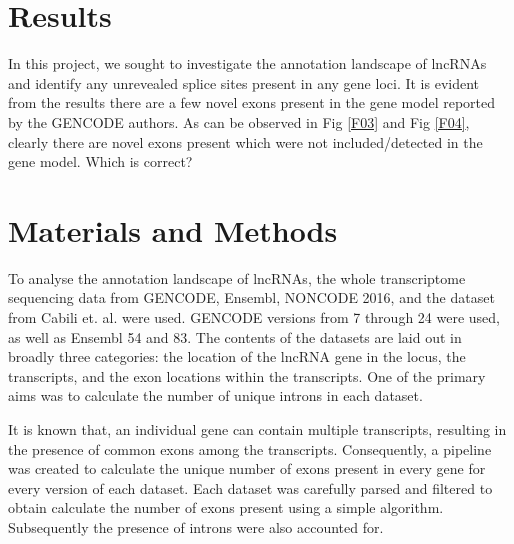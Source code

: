 \documentclass[ncrna,article,submit,moreauthors,pdftex,10pt,a4paper]{mdpi}
\newcommand{\TODO}[1]{\begingroup\color{red}#1\endgroup}
\begin{document}
\section{Results}

In this project, we sought to investigate the annotation landscape of lncRNAs and identify any unrevealed splice sites present
in any gene loci.
It is evident from the results there are a few novel exons present in the gene model reported by the GENCODE authors. As can be observed in
Fig \ref{F03} and Fig \ref{F04}, clearly there are novel exons present which were not included/detected in the gene model. \TODO{Which is correct?}





\section{Materials and Methods}

To analyse the annotation landscape of lncRNAs, the whole transcriptome sequencing data from GENCODE, Ensembl, NONCODE 2016, 
and the dataset from Cabili et. al. were used. GENCODE versions from 7 through 24 were used, as well as Ensembl 54 and 83.
The contents of the datasets are laid out in broadly three categories: the location of the lncRNA gene in the locus, 
the transcripts, and the exon locations within the transcripts. One of the primary aims was to calculate
the number of unique introns in each dataset. 

It is known that, an individual gene can contain multiple transcripts, resulting in the presence of common exons among the transcripts.
 Consequently, a pipeline was created to calculate the unique number of exons present in every gene for every version of each dataset. 
 Each dataset was carefully parsed and filtered to obtain calculate the number of exons present using a simple algorithm. Subsequently
 the presence of introns were also accounted for.
 
\end{document}
